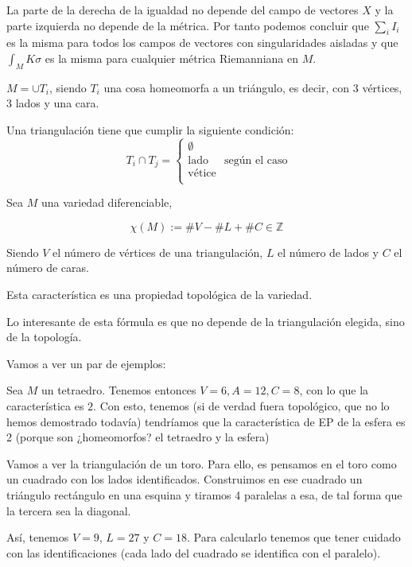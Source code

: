 \obs La parte de la derecha de la igualdad no depende del campo de vectores $X$ y la parte izquierda no depende de la métrica. Por tanto podemos concluir que $\sum_i I_i$ es la misma para todos los campos de vectores con singularidades aisladas y que $\int_M Kσ$ es la misma para cualquier métrica Riemanniana en $M$.


\begin{defn}[Triangulación]  $M=∪T_i$, siendo $T_i$ una cosa homeomorfa a un triángulo, es decir, con 3 vértices, 3 lados y una cara.

Una triangulación tiene que cumplir la siguiente condición:
\[
T_i ∩ T_j = \begin{cases}
\emptyset\\
\text{lado}\\
\text{vétice}\\
\end{cases}
\text{ según el caso}\]
\end{defn}


\begin{defn}
Sea $M$ una variedad diferenciable,

$$\chi(M) := \#V - \#L + \#C ∈ℤ$$

Siendo $V$ el número de vértices de una triangulación, $L$ el número de lados y $C$ el número de caras.


Esta característica es una propiedad topológica de la variedad.
\end{defn}

Lo interesante de esta fórmula es que no depende de la triangulación elegida, sino de la topología.

Vamos a ver un par de ejemplos:

\begin{example}
Sea $M$ un tetraedro. Tenemos entonces $V=6,A=12,C=8$, con lo que la característica es $2$. Con esto, tenemos (si de verdad fuera topológico, que no lo hemos demostrado todavía) tendríamos que la característica de EP de la esfera es 2 (porque son ¿homeomorfos? el tetraedro y la esfera)
\end{example}

\begin{example}

Vamos a ver la triangulación de un toro. Para ello, es pensamos en el toro como un cuadrado con los lados identificados. Construimos en ese cuadrado un triángulo rectángulo en una esquina y tiramos 4 paralelas a esa, de tal forma que la tercera sea la diagonal.

Así, tenemos $V=9$, $L=27$ y $C=18$. Para calcularlo tenemos que tener cuidado con las identificaciones (cada lado del cuadrado se identifica con el paralelo).
\end{example}


